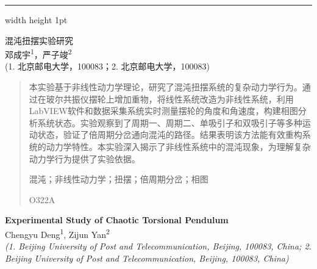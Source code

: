 \documentclass[12pt,a4paper]{article}
\begin{document}
\thispagestyle{firstpage}

\vspace*{-2cm}
\hrule width \textwidth height 1pt
\vspace{1.5cm}

\begin{center}
    {\heiti 混沌扭摆实验研究} \\[0.5\baselineskip]

    {\kaishu 邓成宇\textsuperscript{1}，严子竣\textsuperscript{2}} \\[0.3\baselineskip]

    {\kaishu (1. 北京邮电大学，100083；2. 北京邮电大学，100083)} \\[0.5\baselineskip]
\end{center}

\begin{quote}
    \songti
    \setlength{\leftskip}{2em}
    \setlength{\rightskip}{2em}

    本实验基于非线性动力学理论，研究了混沌扭摆系统的复杂动力学行为。通过在玻尔共振仪摆轮上增加重物，将线性系统改造为非线性系统，利用LabVIEW软件和数据采集系统实时测量摆轮的角度和角速度，构建相图分析系统状态。实验观察到了周期一、周期二、单吸引子和双吸引子等多种运动状态，验证了倍周期分岔通向混沌的路径。结果表明该方法能有效重构系统的动力学特性。本实验深入揭示了非线性系统中的混沌现象，为理解复杂动力学行为提供了实验依据。

    \vspace{0.5\baselineskip}
    混沌；非线性动力学；扭摆；倍周期分岔；相图

    O322A
\end{quote}

\vspace{1cm}

\begin{center}
    {\fontsize{15}{18}\selectfont\bfseries Experimental Study of Chaotic Torsional Pendulum} \\[0.3\baselineskip]

    {\fontsize{10.5}{12.6}\selectfont Chengyu Deng\textsuperscript{1}, Zijun Yan\textsuperscript{2}} \\[0.3\baselineskip]

    {\fontsize{9}{10.8}\selectfont\itshape (1. Beijing University of Post and Telecommunication, Beijing, 100083, China; 2. Beijing University of Post and Telecommunication, Beijing, 100083, China)} \\[0.5\baselineskip]
\end{center}
\end{document}
